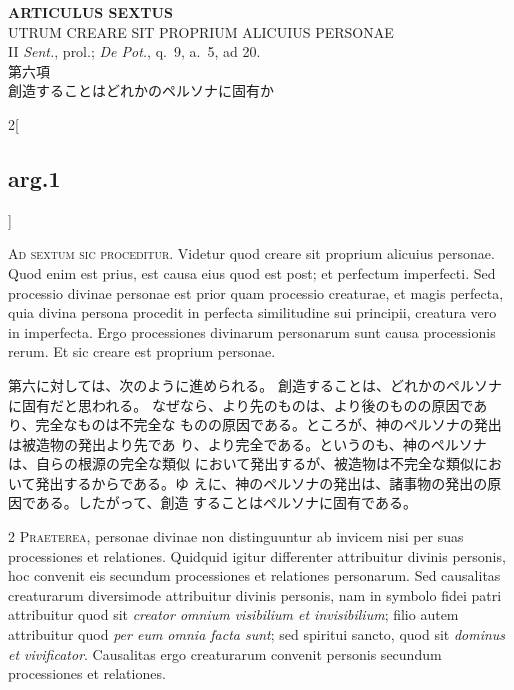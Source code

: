 \documentclass[paper=a4paper,fontsize=10pt,jafontsize=9pt,titlepage]{jlreq}
\begin{document}
\newpage
{}
{}
\setcounter{section}{6}
\setcounter{subsection}{0}

\begin{center}
 {\Large {\bfseries ARTICULUS SEXTUS}}\\
 {\large UTRUM CREARE SIT PROPRIUM ALICUIUS PERSONAE}\\
 {\footnotesize II {\itshape Sent.}, prol.; {\itshape De Pot.}, q.~9,
 a.~5, ad 20.}\\
 {\Large 第六項\\創造することはどれかのペルソナに固有か}
\end{center}

\begin{paracol}{2}[\subsection{arg.1}]

{\huge A}{\scshape d sextum sic proceditur}. Videtur quod
creare sit proprium alicuius personae. Quod enim est prius, est causa
eius quod est post; et perfectum imperfecti. Sed processio divinae
personae est prior quam processio creaturae, et magis perfecta, quia
divina persona procedit in perfecta similitudine sui principii, creatura
vero in imperfecta. Ergo processiones divinarum personarum sunt causa
processionis rerum. Et sic creare est proprium personae.

\switchcolumn

第六に対しては、次のように進められる。
創造することは、どれかのペルソナに固有だと思われる。
なぜなら、より先のものは、より後のものの原因であり、完全なものは不完全な
 ものの原因である。ところが、神のペルソナの発出は被造物の発出より先であ
 り、より完全である。というのも、神のペルソナは、自らの根源の完全な類似
 において発出するが、被造物は不完全な類似において発出するからである。ゆ
 えに、神のペルソナの発出は、諸事物の発出の原因である。したがって、創造
 することはペルソナに固有である。


{\scshape 2 Praeterea}, personae divinae non distinguuntur ab invicem
nisi per suas processiones et relationes. Quidquid igitur differenter
attribuitur divinis personis, hoc convenit eis secundum processiones et
relationes personarum. Sed causalitas creaturarum diversimode
attribuitur divinis personis, nam in symbolo fidei patri attribuitur
quod sit {\itshape creator omnium visibilium et invisibilium}; filio
autem attribuitur quod {\itshape per eum omnia facta sunt}; sed spiritui
sancto, quod sit {\itshape dominus et vivificator}. Causalitas ergo
creaturarum convenit personis secundum processiones et relationes.


\end{paracol}
\end{document}
